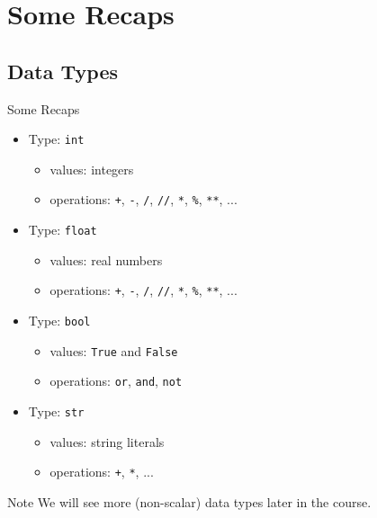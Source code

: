 \documentclass[t,handout,9pt]{beamer}
\begin{document}
\section{Some Recaps}
\subsection{Data Types}
\begin{frame}{Some Recaps}
\begin{itemize}
	\item Type: \texttt{int}
	\begin{itemize}
		\item values: integers
		\item operations: \texttt{+}, \texttt{-}, \texttt{/}, \texttt{//}, \texttt{*}, \texttt{\%}, \texttt{**}, ...
	\end{itemize}
	\item Type: \texttt{float}
	\begin{itemize}
		\item values: real numbers
		\item operations: \texttt{+}, \texttt{-}, \texttt{/}, \texttt{//}, \texttt{*}, \texttt{\%}, \texttt{**}, ...
	\end{itemize}
	\item Type: \texttt{bool}
	\begin{itemize}
		\item values: \texttt{True} and \texttt{False}
		\item operations: \texttt{or}, \texttt{and}, \texttt{not}
	\end{itemize}
	\item Type: \texttt{str}
	\begin{itemize}
		\item values: string literals
		\item operations: \texttt{+}, \texttt{*}, ...
	\end{itemize}
\end{itemize}
\begin{block}{Note}
We will see more (non-scalar) data types later in the course.
\end{block}
\end{frame}
%
\end{document}
